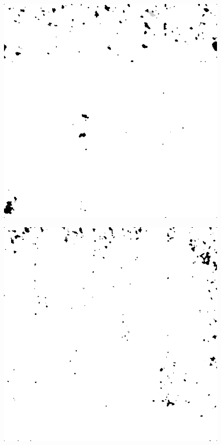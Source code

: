 \begin{figure}[H]
\begin{minipage}[t]{0.3\linewidth}
	\label{fig:car_m5}
\end{minipage}
\begin{minipage}[t]{0.3\linewidth} %
	\includegraphics[width = 1\linewidth]{gfx/hus/hus_m5.png}
	\subcaption{}
	\label{fig:hus_m5}
\end{minipage}
\begin{minipage}[t]{0.3\linewidth} %
	\includegraphics[width = 1\linewidth]{gfx/sit/sit_m10.png}

\end{minipage}
\end{figure}
